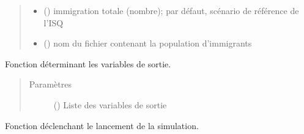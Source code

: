 \documentclass[letterpaper,10pt,french]{sphinxmanual}
\begin{document}
\begin{fulllineitems}
\begin{fulllineitems}
\begin{quote}
\begin{description}
\begin{itemize}
\item {} 
 () \textendash{} immigration totale (nombre); par défaut, scénario de référence de l’ISQ

\item {} 
 () \textendash{} nom du fichier contenant la population d’immigrants

\end{itemize}

\end{description}\end{quote}

\end{fulllineitems}


\begin{fulllineitems}
\label{\detokenize{code:simgen.model.set_statistics}}
Fonction déterminant les variables de sortie.
\begin{quote}\begin{description}
\item[{Paramètres}] \leavevmode
{} () \textendash{} Liste des variables de sortie

\end{description}\end{quote}

\end{fulllineitems}


\begin{fulllineitems}
\label{\detokenize{code:simgen.model.simulate}}
Fonction déclenchant le lancement de la simulation.


\end{fulllineitems}
\end{fulllineitems}
\end{document}
